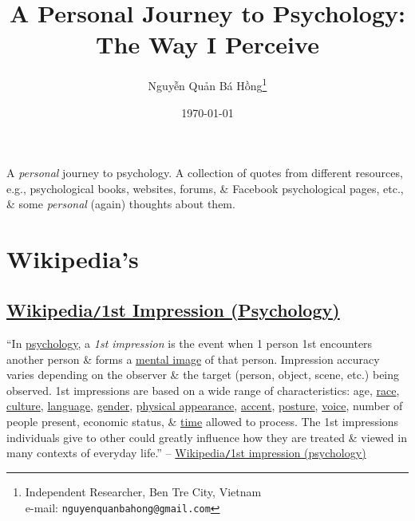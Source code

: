 \documentclass[oneside]{book}
\title{A Personal Journey to Psychology: The Way I Perceive}
\author{\selectlanguage{vietnamese} Nguyễn Quản Bá Hồng\footnote{Independent Researcher, Ben Tre City, Vietnam\\e-mail: \texttt{nguyenquanbahong@gmail.com}}}
\date{\today}
\numberwithin{equation}{section}
\begin{document}
\maketitle
\setcounter{tocdepth}{3}
\setcounter{secnumdepth}{3}
\tableofcontents
\newpage

A \textit{personal} journey to psychology. A collection of quotes from different resources, e.g., psychological books, websites, forums, \& Facebook psychological pages, etc., \& some \textit{personal} (again) thoughts about them.


\chapter{Wikipedia's}

\section{\href{https://en.wikipedia.org/wiki/First_impression_(psychology)}{Wikipedia\texttt{/}1st Impression (Psychology)}}
``In \href{https://en.wikipedia.org/wiki/Psychology}{psychology}, a \textit{1st impression} is the event when 1 person 1st encounters another person \& forms a \href{https://en.wikipedia.org/wiki/Mental_image}{mental image} of that person. Impression accuracy varies depending on the observer \& the target (person, object, scene, etc.) being observed. 1st impressions are based on a wide range of characteristics: age, \href{https://en.wikipedia.org/wiki/Race_(human_categorization)}{race}, \href{https://en.wikipedia.org/wiki/Culture}{culture}, \href{https://en.wikipedia.org/wiki/Language}{language}, \href{https://en.wikipedia.org/wiki/Gender}{gender}, \href{https://en.wikipedia.org/wiki/Physical_appearance}{physical appearance}, \href{https://en.wikipedia.org/wiki/Accent_(sociolinguistics)}{accent}, \href{https://en.wikipedia.org/wiki/Posture_(psychology)}{posture}, \href{https://en.wikipedia.org/wiki/Voice}{voice}, number of people present, economic status, \& \href{https://en.wikipedia.org/wiki/Time}{time} allowed to process. The 1st impressions individuals give to other could greatly influence how they are treated \& viewed in many contexts of everyday life.'' -- \href{https://en.wikipedia.org/wiki/First_impression_(psychology)}{Wikipedia\texttt{/}1st impression (psychology)}
\end{document}
